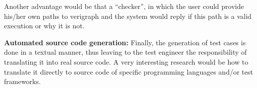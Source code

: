 Another advantage would be that a ``checker'', in which the user could provide his/her own paths to verigraph and the system would reply if this path is a valid execution or why it is not.

\textbf{Automated source code generation:}
  Finally, the generation of test cases is done in a textual manner, thus leaving to the test engineer  the responsibility of translating it into real source code. A very interesting research would be how to translate it directly to source code of specific programming languages and/or test frameworks.
